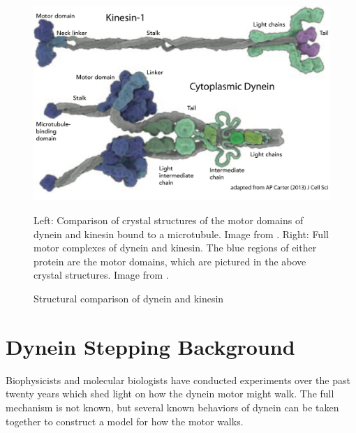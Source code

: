 \documentclass[
11pt, %
english, %
singlespacing, %
headsepline, %
chapterinoneline, %
]{MastersDoctoralThesis} %
\begin{document}
\begin{figure}[H]
\begin{minipage}{0.65\textwidth}
    \includegraphics[width=\textwidth,keepaspectratio]{../../figures/kinesin_vs_dynein_2}
  \end{minipage}
  \caption{Structural comparison of dynein and kinesin}{Left: Comparison of crystal structures of the motor domains of dynein and kinesin bound to a microtubule. Image from \cite{kinesin-vs-dynein}. Right: Full motor complexes of dynein and kinesin. The blue regions of either protein are the motor domains, which are pictured in the above crystal structures. Image from \cite{kinesin-vs-dynein-2}.}
  \label{fig:kinesin-vs-dynein}
\end{figure}

\section{Dynein Stepping Background}
Biophysicists and molecular biologists have conducted experiments over the past twenty years which shed light on how the dynein motor might walk. The full mechanism is not known, but several known behaviors of dynein can be taken together to construct a model for how the motor walks.\\
\end{document}
